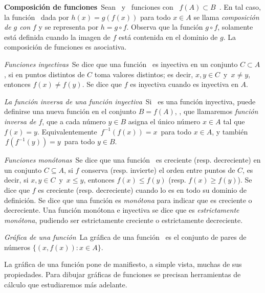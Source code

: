 \documentclass[oneside,spanish,2m,twoside,svgnames,x11names,HTML,12pt]{libro-matua}\usepackage[]{graphicx}\usepackage[]{color}
\begin{document}
\begin{defi}\textbf{{Composición de funciones}{}}\ Sean \ y
\ funciones con %
\mbox{%
$f(A)\subset B$%
}. En tal caso, la función \ dada por $h(x)=g(f(x))$
para todo $x\in A$ se llama \emph{composición de $g$ con $f$} y
se representa por $h=g\circ f$. Observa que la función $g\circ f$,
solamente está definida cuando la imagen de $f$ está contenida en
el dominio de $g$. La composición de funciones es asociativa. \end{defi} 

\begin{defi}\textit{{Funciones inyectivas}{}}\ Se dice que una
función \ es inyectiva en un conjunto $C\subset A$,
si en puntos distintos de $C$ toma valores distintos; es decir, $x,y\in C\,$
y $\,x\neq y$, entonces $f(x)\neq f(y)$. Se dice que $f$ es inyectiva
cuando es inyectiva en $A$. 

\end{defi}

\begin{defi}\textit{{La función inversa de una función inyectiva}{}}\label{funcioninversa}\ Si
\ es una función inyectiva, puede definirse una
nueva función en el conjunto $B=f(A)$, ,
que llamaremos \emph{función inversa de $f$}, que a cada número $y\in B$
asigna el único número $x\in A$ tal que $f(x)=y$. Equivalentemente
$\,f^{-1}(f(x))=x\,$ para todo $x\in A$, y también $\,f(f^{-1}(y))=y\,$
para todo $y\in B$. \end{defi}

\begin{defi}\textit{{Funciones monótonas}{}}\ Se dice que una
función \ es creciente (resp. decreciente) en
un conjunto $C\subseteq A$, si $f$ conserva (resp. invierte) el
orden entre puntos de $C$, es decir, si $x,y\in C\,$ y $\,x\leqslant y$,
entonces $f(x)\leqslant f(y)$ (resp. $f(x)\geqslant f(y)$). Se dice
que $f$ es creciente (resp. decreciente) cuando lo es en todo su
dominio de definición. Se dice que una función es \emph{monótona}
para indicar que es creciente o decreciente. Una función monótona
e inyectiva se dice que es \emph{estrictamente monótona}, pudiendo
ser estrictamente creciente o estrictamente decreciente. \end{defi}
\begin{defi}\textit{{Gráfica de una función}{}}\ La gráfica de
una función \ es el conjunto de pares de números
$\{(x,f(x)):x\in A\}$. \end{defi} La gráfica de una función pone
de manifiesto, a simple vista, muchas de sus propiedades. Para dibujar
gráficas de funciones se precisan herramientas de cálculo que estudiaremos
más adelante.
\end{document}
